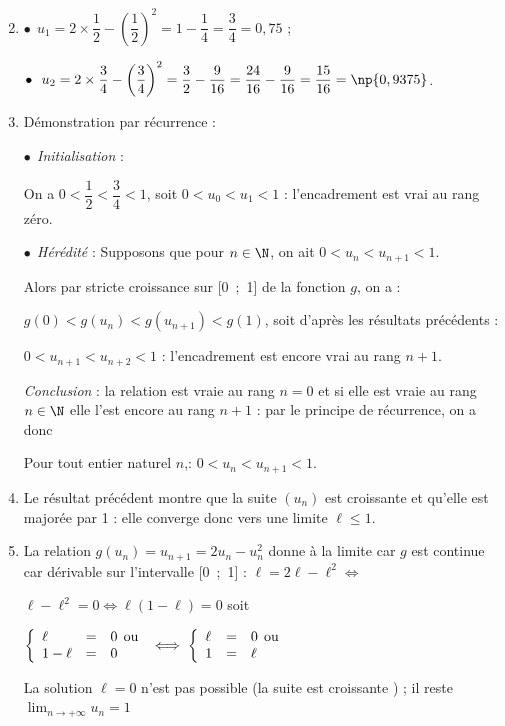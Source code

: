 \begin{enumerate}
\setcounter{enumi}{1}
\item 
$\bullet~~u_1 = 2 \times \dfrac{1}{2} - \left(\dfrac{1}{2}\right)^2 = 1 - \dfrac14 = \dfrac34 = 0,75$ ;

$\bullet~~u_2 = 2 \times \dfrac34 - \left(\dfrac34\right)^2 = \dfrac32 - \dfrac{9}{16} = \dfrac{24}{16} -  \dfrac{9}{16} = \dfrac{15}{16} = \np{0,9375}$.
\item 
Démonstration par récurrence :

$\bullet~~$\emph{Initialisation} :

On a $0 < \dfrac12 < \dfrac34 < 1$, soit $0 < u_0 < u_1 < 1$ : l'encadrement est vrai au rang zéro.

$\bullet~~$\emph{Hérédité} :
Supposons que pour $n \in \N$, on ait $0 < u_{n} < u_{n+1}< 1$.

Alors par stricte croissance sur [0~;~1] de la fonction $g$, on a :

$g(0) < g\left(u_n\right) < g\left(u_{n+1} \right) < g(1)$, soit d'après les résultats précédents :

$0 < u_{n+1} < u_{n+2} < 1$ : l'encadrement est encore vrai au rang $n + 1$.

\emph{Conclusion} : la relation est vraie au rang $n = 0$ et si elle est vraie au rang $n \in \N$ elle l'est encore au rang $n + 1$ : par le principe de récurrence, on a donc 

Pour tout entier naturel $n$,\:: $0 < u_{n} < u_{n+1} < 1$.
\item 
Le résultat précédent montre que la suite $\left(u_{n}\right)$ est croissante  et qu'elle est majorée par 1 : elle converge donc vers une limite $\ell \leqslant 1$.
\item 
La relation $g\left(u_n\right) = u_{n+1} = 2u_n - u_n^2$ donne à la limite car $g$ est continue car dérivable sur l'intervalle [0~;~1] : $\ell = 2\ell - \ell^2 \iff $

$\ell - \ell^2 = 0 \iff \ell (1 - \ell) = 0$ soit 

$\left\{\begin{array}{l c l}
\ell&=&0 \:\:\text{ou}\\
1 - \ell&=&0
\end{array}\right. \iff \left\{\begin{array}{l c l}
\ell&=&0 \:\:\text{ou}\\
1  &=&\ell
\end{array}\right.$

La solution $\ell = 0 $ n'est pas possible (la suite est croissante ) ; il reste $\displaystyle\lim_{n \to + \infty} u_n = 1$
\end{enumerate}


